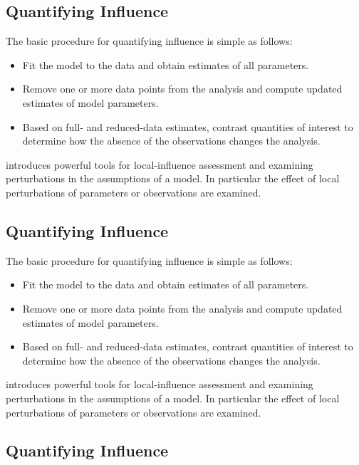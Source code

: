 \documentclass[Main.tex]{subfiles}
\begin{document}
	
	\subsection{Quantifying Influence}  %
	
	The basic procedure for quantifying influence is simple as follows:
	
	\begin{itemize}
		\item Fit the model to the data and obtain estimates of all parameters.
		\item Remove one or more data points from the analysis and compute updated estimates of model parameters.
		\item Based on full- and reduced-data estimates, contrast quantities of interest to determine how the absence of the observations changes the analysis.
	\end{itemize}
	
	\citet{cook86} introduces powerful tools for local-influence assessment and examining perturbations in the assumptions of a model. In particular the effect of local perturbations of parameters or observations are examined.
	
	\subsection{Quantifying Influence}  %
	
	The basic procedure for quantifying influence is simple as follows:
	
	\begin{itemize}
		\item Fit the model to the data and obtain estimates of all parameters.
		\item Remove one or more data points from the analysis and compute updated estimates of model parameters.
		\item Based on full- and reduced-data estimates, contrast quantities of interest to determine how the absence of the observations changes the analysis.
	\end{itemize}
	
	\citet{cook86} introduces powerful tools for local-influence assessment and examining perturbations in the assumptions of a model. In particular the effect of local perturbations of parameters or observations are examined.
	
	\subsection{Quantifying Influence}  %
	
\end{document}
